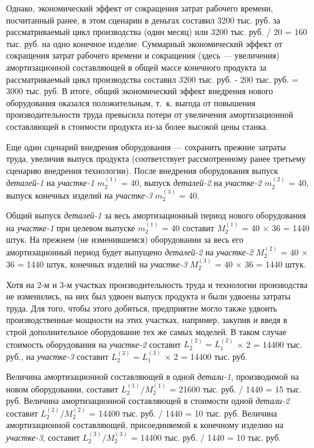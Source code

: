 \documentclass{article}
\let\textitorig\textit
\renewcommand{\textit}[1]{{\fontfamily{cmr}\selectfont \textitorig{#1}}}
\begin{document}
Однако, экономический эффект от сокращения затрат рабочего времени, посчитанный ранее, в этом сценарии в деньгах составил 3200 тыс. руб. за рассматриваемый цикл производства (один месяц) или 3200 тыс. руб. / 20 = 160 тыс. руб. на одно конечное изделие. Суммарный экономический эффект от сокращения затрат рабочего времени и сокращения (здесь — увеличения) амортизационной составляющей в общей массе конечного продукта за рассматриваемый цикл производства составил 3200 тыс. руб. - 200 тыс. руб. = 3000 тыс. руб. В итоге, общий экономический эффект внедрения нового оборудования оказался положительным, т.~к. выгода от повышения производительности труда превысила потери от увеличения амортизационной составляющей в стоимости продукта из-за более высокой цены станка.

Еще один сценарий внедрения оборудования — сохранить прежние затраты труда, увеличив выпуск продукта (соответствует рассмотренному ранее третьему сценарию внедрения технологии). После внедрения оборудования выпуск \textit{деталей-1} на \textit{участке-1} $m_2^{(1)}$ = 40, выпуск \textit{деталей-2} на \textit{участке-2} $m_2^{(2)}$ = 40, выпуск конечных изделий на \textit{участке-3} $m_2^{(3)}$ = 40.

Общий выпуск \textit{деталей-1} за весь амортизационный период нового оборудования на \textit{участке-1} при целевом выпуске $m_2^{(1)}$ = 40 составит $M_2^{(1)}$ = 40 × 36 = 1440 штук. На прежнем (не изменившемся) оборудовании за весь его амортизационный период будет выпущено \textit{деталей-2} на \textit{участке-2} $M_2^{(2)}$ = 40 × 36 = 1440 штук, конечных изделий на \textit{участке-3} $M_2^{(3)}$ = 40 × 36 = 1440 штук.

Хотя на 2-м и 3-м участках производительность труда и технологии производства не изменились, на них был удвоен выпуск продукта и были удвоены затраты труда. Для того, чтобы этого добиться, предприятие могло также удвоить производственные мощности на этих участках, например, закупив и введя в строй дополнительное оборудование тех же самых моделей. В таком случае стоимость оборудования на \textit{участке-2} составит $L_2^{(2)} = L_1^{(2)}$ × 2 = 14400 тыс. руб., на \textit{участке-3} составит $L_2^{(3)} = L_1^{(3)}$ × 2 = 14400 тыс. руб.

Величина амортизационной составляющей в одной \textit{детали-1}, производимой на новом оборудовании, составит $L_2^{(1)} / M_2^{(1)}$ = 21600 тыс. руб. / 1440 = 15 тыс. руб. Величина амортизационной составляющей в стоимости одной \textit{детали-2} составит $L_2^{(2)} / M_2^{(2)}$ = 14400 тыс. руб. / 1440 = 10 тыс. руб. Величина амортизационной составляющей, присоединяемой к конечному изделию на \textit{участке-3}, составит $L_2^{(3)} / M_2^{(3)}$ = 14400 тыс. руб. / 1440 = 10 тыс. руб.
\end{document}
